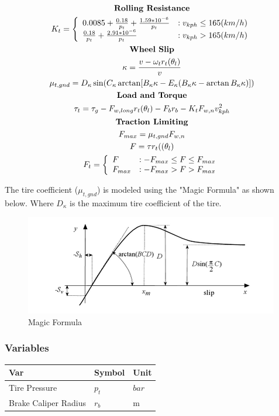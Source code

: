 \documentclass[../SimBALink.tex]{subfiles}
\begin{document}
\begin{gather}
\notag \textbf{Rolling Resistance} \\
K_t = 
\left\{
  \begin{array}{lr}
    0.0085 + \frac{0.18}{p_t} + \frac{1.59*10^{-6}}{p_t} & : v_{kph} \le 165 (km/h)\\
    \frac{0.18}{p_t} + \frac{2.91*10^{-6}}{p_t} & : v_{kph} > 165 (km/h)
  \end{array}
\right. \\
\notag \textbf{Wheel Slip} \\
\kappa = \frac{v - \omega_t r_t(\theta_l)}{v} \\
\mu_{t,gnd} = D_{\kappa}\sin(C_{\kappa} \arctan[B_{\kappa}\kappa - E_{\kappa}(B_{\kappa}\kappa - \arctan B_{\kappa}\kappa)]) \\
\notag \textbf{Load and Torque} \\
\tau_t = \tau_g - F_{w,long}r_t(\theta_l) - F_br_b - K_t F_{w,n} v_{kph}^2 \\
\notag \textbf{Traction Limiting} \\
F_{max} = \mu_{t,gnd} F_{w,n} \\
F = \tau r_t((\theta_l) \\
F_t =
\left\{
  \begin{array}{lr}
	F & : -F_{max} \le F \le F_{max} \\
	F_{max} & : -F_{max} > F > F_{max}
  \end{array}
\right. 
\end{gather}

The tire coefficient ($\mu_{t,gnd}$) is modeled using the "Magic Formula" as shown below. Where $D_{\kappa}$ is the maximum tire coefficient of the tire. 

 \begin{figure}[h!]
  \centering
  \includegraphics[scale=1]{magic_formula}
  \caption{Magic Formula }
\end{figure}

\subsubsection{Variables}
	\begin{tabular}{ l | l | l  }
		Var					&	Symbol		&	Unit		\\	\hline
		Tire Pressure		&	$p_t$		&	 $bar$ \\
		Brake Caliper Radius &	$r_b$		&	m \\
	\end{tabular}
\end{document}
